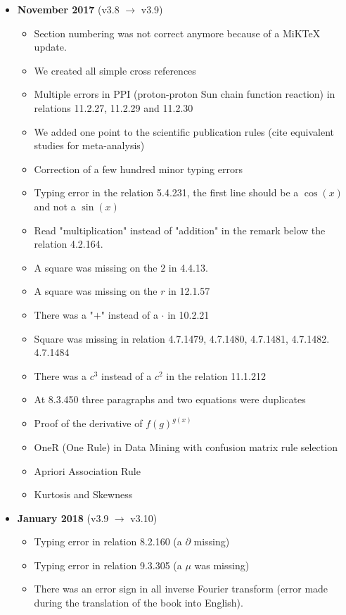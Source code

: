 \documentclass[12pt,a4paper,twoside,openright]{report}
\theoremstyle{definition}
\theoremstyle{itexmp}
\numberwithin{equation}{section}
\begin{document}
\begin{itemize}
\begin{itemize}[noitemsep]
		\end{itemize}
	\item \textbf{November 2017} (v3.8 $\rightarrow$ v3.9)
		\begin{itemize}[noitemsep]
			\item Section numbering was not correct anymore because of a MiKTeX update.
			\item We created all simple cross references
			\item Multiple errors in PPI (proton-proton Sun chain function reaction) in relations 11.2.27, 11.2.29 and 11.2.30
			\item We added one point to the scientific publication rules (cite equivalent studies for meta-analysis)
			\item Correction of a few hundred minor typing errors
			\item Typing error in the relation 5.4.231, the first line should be a $\cos(x)$ and not a $\sin(x)$
			\item Read "multiplication" instead of "addition" in the remark below the relation 4.2.164.
			\item A square was missing on the $2$ in 4.4.13.
			\item A square was missing on the $r$ in 12.1.57
			\item There was a "$+$" instead of a $\cdot$ in 10.2.21
			\item Square was missing in relation 4.7.1479, 4.7.1480, 4.7.1481, 4.7.1482. 4.7.1484
			\item There was a $c^3$ instead of a $c^2$ in the relation 11.1.212
			\item At 8.3.450 three paragraphs and two equations were duplicates
			\item Proof of the derivative of $f(g)^{g(x)}$
			\item OneR (One Rule) in Data Mining with confusion matrix rule selection
			\item Apriori Association Rule
			\item Kurtosis and Skewness
		\end{itemize}
	\item \textbf{January 2018} (v3.9 $\rightarrow$ v3.10)
		\begin{itemize}[noitemsep]
			\item Typing error in relation 8.2.160 (a $\partial$ missing)
			\item Typing error in relation 9.3.305 (a $\mu$ was missing)
			\item There was an error sign in all inverse Fourier transform (error made during the translation of the book into English).

\end{itemize}
\end{itemize}
\end{document}
